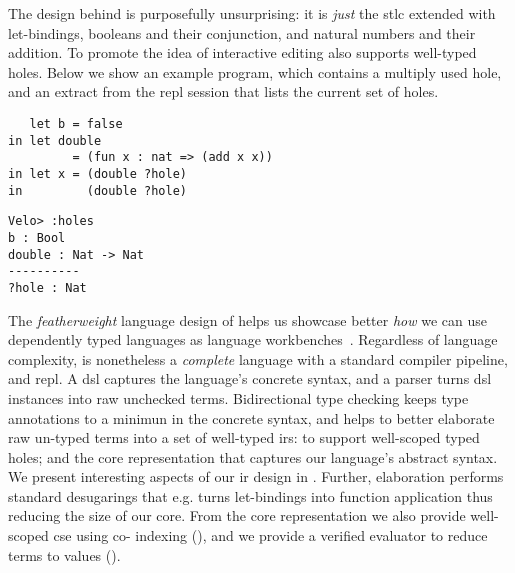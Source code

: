The design behind \Velo{} is purposefully unsurprising:
%
it is \emph{just} the \ac{stlc} extended with let-bindings, booleans and their conjunction, and natural numbers and their addition.
%
To promote the idea of interactive editing \Velo{} also supports well-typed holes.
%
Below we show an example \Velo{} program, which contains a multiply used hole, and an extract from the \acs*{repl}
session that lists the current set of holes.

\begin{center}
  \begin{minipage}[t]{0.55\linewidth}
\begin{Verbatim}
   let b = false
in let double
         = (fun x : nat => (add x x))
in let x = (double ?hole)
in         (double ?hole)
\end{Verbatim}
\end{minipage}
\hfill
  \begin{minipage}[t]{0.35\linewidth}
    \begin{Verbatim}
Velo> :holes
b : Bool
double : Nat -> Nat
----------
?hole : Nat
\end{Verbatim}
\end{minipage}

\end{center}

The \emph{featherweight} language design of \Velo{} helps us showcase better \emph{how} we can use dependently typed languages as language workbenches~\cite{DBLP:journals/toplas/IgarashiPW01}.
%
Regardless of language complexity, \Velo{} is nonetheless a \emph{complete} language with a standard compiler pipeline, and \acs*{repl}.
%
A \ac{dsl} captures the language's concrete syntax, and a parser turns \ac{dsl} instances into raw unchecked terms.
%
Bidirectional type checking keeps type annotations to a minimun in the concrete syntax, and helps to better elaborate raw un-typed terms into a set of well-typed \acp{ir}:
%
 to support well-scoped typed holes;
%
and
%
 the core representation that captures our language's abstract syntax.
%
We present interesting aspects of our \ac{ir} design in .
%
Further, elaboration performs standard desugarings that e.g. turns let-bindings into function application thus reducing the size of our core.
%
From the core representation we also provide well-scoped \ac{cse} using co-\DeBruijn{} indexing (), and we provide a verified evaluator to reduce terms to values ().



